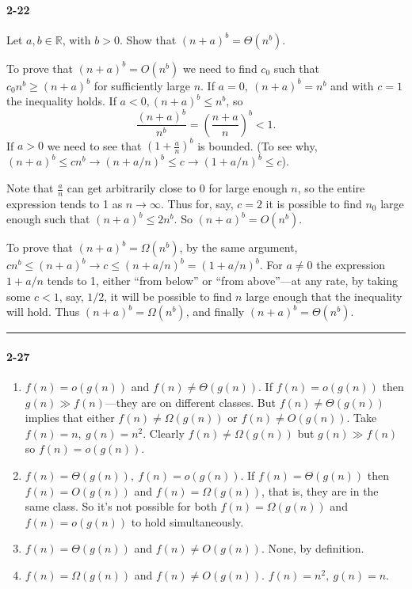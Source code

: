 \documentclass{report}
\newcommand{\R}{\mathbb{R}}
\newcommand{\okthen}{\rule[-1.4pt]{0.3em}{0.77em}}
\begin{document}
\paragraph{2-22} Let $a, b \in \R$, with $b > 0$. Show that $(n+a)^b = \Theta(n^b)$.

\medskip

To prove that $(n+a)^b = O(n^b)$ we need to find $c_0$ such that $c_0 n^b \ge (n+a)^b$ for sufficiently large $n$. If $a=0,\ (n+a)^b = n^b$ and with $c=1$ the inequality holds. If $a<0, (n+a)^b \le n^b$, so
\[ \frac{(n+a)^b}{n^b} = \left(\frac{n+a}{n}\right)^b < 1. \]
If $a>0$ we need to see that $\left(1 + \frac{a}{n}\right)^b$ is bounded. (To see why, $(n+a)^b \le c n^b \to (n+a/n)^b \le c \to (1 + a/n)^b \le c$).

Note that $\frac{a}{n}$ can get arbitrarily close to 0 for large enough $n$, so the entire expression tends to 1 as $n\to\infty$. Thus for, say, $c=2$ it is possible to find $n_0$ large enough such that $(n+a)^b \le 2n^b$. So $(n+a)^b = O(n^b)$.

\medskip

To prove that $(n+a)^b = \Omega(n^b)$, by the same argument, $c n^b \le (n+a)^b \to c \le (n+a/n)^b = (1 + a/n)^b$. For $a\ne0$ the expression $1+a/n$ tends to 1, either ``from below'' or ``from above''---at any rate, by taking some $c<1$, say, $1/2$, it will be possible to find $n$ large enough that the inequality will hold. Thus $(n+a)^b = \Omega(n^b)$, and finally $(n+a)^b = \Theta(n^b)$.\ \okthen

\paragraph{2-27}
\begin{enumerate}[label=(\alph*)]
	\item $f(n) = o(g(n))$ and $f(n)\ne\Theta(g(n))$. If $f(n) = o(g(n))$ then $g(n)\gg f(n)$---they are on different classes. But $f(n)\ne\Theta(g(n))$ implies that either $f(n)\ne\Omega(g(n))$ or $f(n)\ne O(g(n))$. Take $f(n)=n,\ g(n)=n^2$. Clearly $f(n)\ne\Omega(g(n))$ but $g(n)\gg f(n)$ so $f(n)=o(g(n))$.
	\item $f(n) = \Theta(g(n)),\ f(n) = o(g(n))$. If $f(n)=\Theta(g(n))$ then $f(n)=O(g(n))$ and $f(n)=\Omega(g(n))$, that is, they are in the same class. So it's not possible for both $f(n)=\Omega(g(n))$ and $f(n)=o(g(n))$ to hold simultaneously.
	\item $f(n)=\Theta(g(n))$ and $f(n)\ne O(g(n))$. None, by definition.
	\item $f(n)=\Omega(g(n))$ and $f(n)\ne O(g(n))$. $f(n)=n^2,\ g(n)=n$.
\end{enumerate}
\end{document}
